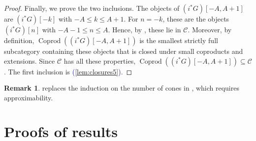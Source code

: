 \documentclass[11pt]{amsart}
\def\eqref#1{\textcolor{darkblue}{(\ref{#1})}}
\theoremstyle{plain}
\theoremstyle{definition}
\newtheorem{remark}[theorem]{Remark}
\numberwithin{equation}{section}
\numberwithin{theorem}{section}
\begin{document}
\begin{proof}
    Finally, we prove the two inclusions.
    The objects of $(i^\ast G)[-A,A+1]$ are $(i^\ast G)[-k]$ with $-A\leq k\leq A+1$.
    For $n = -k$, these are the objects $(i^\ast G)[n]$ with $-A-1\leq n\leq A$.
    Hence, by , these lie in $\mathcal{C}$.
    Moreover, by definition, $\operatorname{Coprod}((i^\ast G)[-A,A+1])$ is the smallest strictly full subcategory containing these objects that is closed under small coproducts and extensions.
    Since $\mathcal{C}$ has all these properties, $\operatorname{Coprod}((i^\ast G)[-A,A+1])\subseteq \mathcal{C}$.
    The first inclusion is \eqref{lem:closures5}.
\end{proof}

\begin{remark}
     replaces the induction on the number of cones in \cite[Lemmas 5.4 and 5.5]{Burke/Neeman/Pauwels:2023}, which requires approximability.
\end{remark}

\section{Proofs of results}
\label{sec:proof_of_results}
\end{document}
